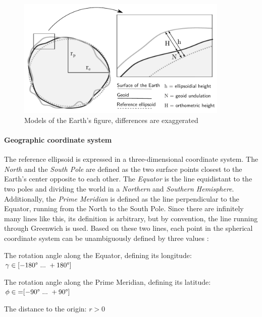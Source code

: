 \begin{figure}[H]
  \centering
  \includegraphics[width=0.9\textwidth]{graphics/basics/hgis/earth_models}
  \caption{Models of the Earth's figure, differences are exaggerated \cite[Fig. 3-6, p. 75]{bolstad2008gis}}
  \label{fig:geoid}
\end{figure}


\paragraph{Geographic coordinate system} %
\label{ssub:geographic_coordinate_system}

The reference ellipsoid is expressed in a three-dimensional coordinate system. The \emph{North} and the \emph{South Pole} are defined as the two surface points closest to the Earth's center opposite to each other. The \emph{Equator} is the line equidistant to the two poles and dividing the world in a \emph{Northern} and \emph{Southern Hemisphere}. Additionally, the \emph{Prime Meridian} is defined as the line perpendicular to the Equator, running from the North to the South Pole. Since there are infinitely many lines like this, its definition is arbitrary, but by convention, the line running through Greenwich is used. Based on these two lines, each point in the spherical coordinate system can be unambiguously defined by three values \cite[pp. 26-28]{bolstad2008gis}:

\begin{compactenum}
  \item The rotation angle along the Equator, defining its longitude: $\gamma \in [-180\degree ~...~ +180\degree]$
  \item The rotation angle along the Prime Meridian, defining its latitude: $\phi \in{=} [-90\degree ~...~ +90\degree]$
  \item The distance to the origin: $r > 0$
\end{compactenum}

